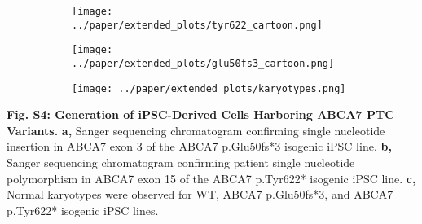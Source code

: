 \begin{figure}[H]
    \begin{subfigure}[t]{0.4\textwidth}
        \caption{}
        \hspace{1.5cm}
        \texttt{[image: ../paper/extended\_plots/tyr622\_cartoon.png]}        
    \end{subfigure}  
    \hspace{1.5cm}
    \begin{subfigure}[t]{0.4\textwidth}
        \caption{}
        \texttt{[image: ../paper/extended\_plots/glu50fs3\_cartoon.png]}        
    \end{subfigure}  
    \par
    \begin{subfigure}[t]{0.9\textwidth}
        \caption{}
        \hspace{1.5cm}
        \texttt{[image: ../paper/extended\_plots/karyotypes.png]}        
    \end{subfigure}  
\end{figure}
\textbf{Fig. S4: Generation of iPSC-Derived Cells Harboring ABCA7 PTC Variants.}
\textbf{a,} Sanger sequencing chromatogram confirming single nucleotide insertion in ABCA7 exon 3 of the ABCA7 p.Glu50fs*3 isogenic iPSC line.
\textbf{b,} Sanger sequencing chromatogram confirming patient single nucleotide polymorphism in ABCA7 exon 15 of the ABCA7 p.Tyr622* isogenic iPSC line. 
\textbf{c,} Normal karyotypes were observed for WT, ABCA7 p.Glu50fs*3, and ABCA7 p.Tyr622* isogenic iPSC lines. 
